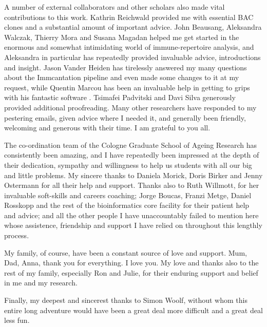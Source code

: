 {A number of external collaborators and other scholars also made vital contributions to this work. Kathrin Reichwald provided me with essential BAC clones and a substantial amount of important advice. John Beausang, Aleksandra Walczak, Thierry Mora and Susana Magadan helped me get started in the enormous and somewhat intimidating world of immune-repertoire analysis, and Aleksandra in particular has repeatedly provided invaluable advice, introductions and insight. Jason Vander Heiden has tirelessly answered my many questions about the Immcantation pipeline and even made some changes to it at my request, while Quentin Marcou has been an invaluable help in getting to grips with his fantastic software . Tsimafei Padvitski and Davi Silva generously provided additional proofreading. Many other researchers have responded to my pestering emails, given advice where I needed it, and generally been friendly, welcoming and generous with their time. I am grateful to you all.

The co-ordination team of the Cologne Graduate School of Ageing Research has consistently been amazing, and I have repeatedly been impressed at the depth of their dedication, sympathy and willingness to help us students with all our big and little problems. My sincere thanks to Daniela Morick, Doris Birker and Jenny Ostermann for all their help and support. Thanks also to Ruth Willmott, for her invaluable soft-skills and careers coaching; Jorge Boucas, Franzi Metge, Daniel Rosskopp and the rest of the bioinformatics core facility for their patient help and advice; and all the other people I have unaccountably failed to mention here whose assistence, friendship and support I have relied on throughout this lengthly process.

My family, of course, have been a constant source of love and support. Mum, Dad, Anna, thank you for everything. I love you. My love and thanks also to the rest of my family, especially Ron and Julie, for their enduring support and belief in me and my research. 

Finally, my deepest and sincerest thanks to Simon Woolf, without whom this entire long adventure would have been a great deal more difficult and a great deal less fun.
}
